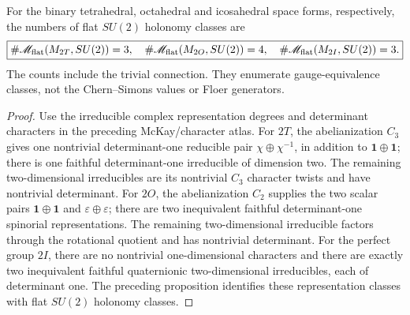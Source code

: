 \documentclass[11pt]{article}
\begin{document}
\begin{corollary}
\label{p1b:cor:v14-flat-su2-counts}
For the binary tetrahedral, octahedral and icosahedral space forms,
respectively, the numbers of flat $SU(2)$ holonomy classes are
\[
\boxed{\#\mathscr M_{\rm flat}(M_{2T},SU(2))=3,\quad
       \#\mathscr M_{\rm flat}(M_{2O},SU(2))=4,\quad
       \#\mathscr M_{\rm flat}(M_{2I},SU(2))=3.}
\]
The counts include the trivial connection. They enumerate gauge-equivalence
classes, not the Chern--Simons values or Floer generators.
\end{corollary}
\begin{proof}
Use the irreducible complex representation degrees and determinant
characters in the preceding McKay/character atlas.  For $2T$, the
abelianization $C_3$ gives one nontrivial determinant-one reducible
pair $\chi\oplus\chi^{-1}$, in addition to $\mathbf1\oplus\mathbf1$;
there is one faithful determinant-one irreducible of dimension two.
The remaining two-dimensional irreducibles are its nontrivial $C_3$
character twists and have nontrivial determinant.  For $2O$, the
abelianization $C_2$ supplies the two scalar pairs
$\mathbf1\oplus\mathbf1$ and $\varepsilon\oplus\varepsilon$;
there are two inequivalent faithful determinant-one spinorial
representations.  The remaining two-dimensional irreducible factors
through the rotational quotient and has nontrivial determinant.
For the perfect group $2I$, there are no nontrivial one-dimensional
characters and there are exactly two inequivalent faithful
quaternionic two-dimensional irreducibles, each of determinant one.
The preceding proposition identifies these representation classes with
flat $SU(2)$ holonomy classes.
\end{proof}
\end{document}
